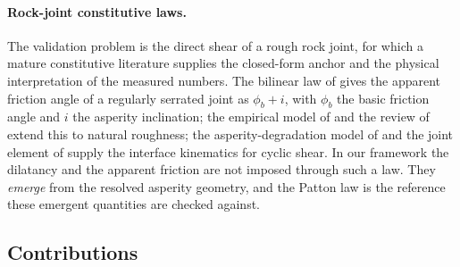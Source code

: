 \paragraph{Rock-joint constitutive laws.}
The validation problem is the direct shear of a rough rock joint, for which a mature constitutive
literature supplies the closed-form anchor and the physical interpretation of the measured numbers. The
bilinear law of \citet{patton1966multiple} gives the apparent friction angle of a regularly serrated
joint as $\phi_b+i$, with $\phi_b$ the basic friction angle and $i$ the asperity inclination; the
empirical model of \citet{barton1977shear} and the review of \citet{barton1990review} extend this to
natural roughness; the asperity-degradation model of \citet{plesha1987constitutive} and the joint element
of \citet{goodman1976methods} supply the interface kinematics for cyclic shear. In our framework the
dilatancy and the apparent friction are not imposed through such a law. They \emph{emerge} from the
resolved asperity geometry, and the Patton law is the reference these emergent quantities are checked
against.

\subsection{Contributions}\label{sec:intro-contributions}

